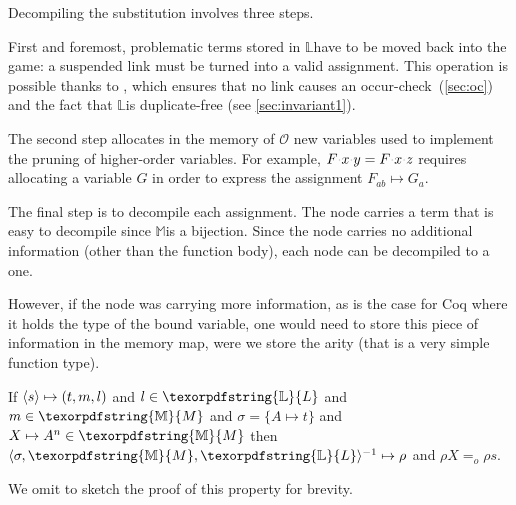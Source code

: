 \documentclass[sigconf,natbib=false,review]{acmart}
\newcommand{\appsep}{\ensuremath{\textcolor{lightgray}{\cdot}}}
\newcommand{\EqualRel}{\ensuremath{=}}
\newcommand{\Eo}{\ensuremath{\EqualRel_o}\xspace}
\newcommand{\Fo}{\texorpdfstring{\ensuremath{\mathcal{O}\xspace}}{O}} %
\newcommand{\Ho}{\texorpdfstring{\ensuremath{\mathcal{M}}\xspace}{M}}
\newcommand{\mapping}[3]{\ensuremath{#1 \mapsto #2^#3}}
\newcommand{\linkStore}{\texorpdfstring{\ensuremath{\mathbb{L}}\xspace}{L}}
\newcommand{\mapStore}{\texorpdfstring{\ensuremath{\mathbb{M}}\xspace}{M}}
\begin{document}
Decompiling the substitution involves three steps.

First and foremost, problematic terms stored in
\linkStore have to be moved back into the game:
a suspended link must be turned into a valid assignment.
This operation is possible thanks to ,
which ensures that no link causes an occur-check~(\ref{sec:oc})
and the fact that \linkStore is duplicate-free (see \cref{sec:invariant1}).

The second step allocates
in the memory of \Fo{}
new variables used to implement the pruning of higher-order variables. 
For example,
$F\appsep x\appsep y = F\appsep x\appsep z$ requires allocating a 
variable $G$ in order to express the assignment $F_{ab} \mapsto G_a$.

The final step is to decompile each assignment. The 
node carries a term that is easy to decompile since \mapStore is a bijection.
Since the  node
carries no additional information (other than the function body),
each  node can be decompiled to a  one.

However, if the  node was carrying more information,
as is the case for Coq where it holds the type of the bound variable,
one would need to store this piece of information in the memory map,
were we store the arity (that is a very simple function type).

\begin{proposition}\label{prop:comprt}
  If $\langle s \rangle\mapsto(t,m,l)$ and $l \in \linkStore$ and $m \in \mapStore$
  and
  $\sigma = \{ A \mapsto t\}$ and $\mapping{X}{A}{n} \in \mapStore$
  then $\D{\sigma}{\mapStore}{\linkStore}{\rho}$ and
  $\rho X \Eo \rho s$.
\end{proposition}

We omit to sketch the proof of this property for brevity.

\end{document}
